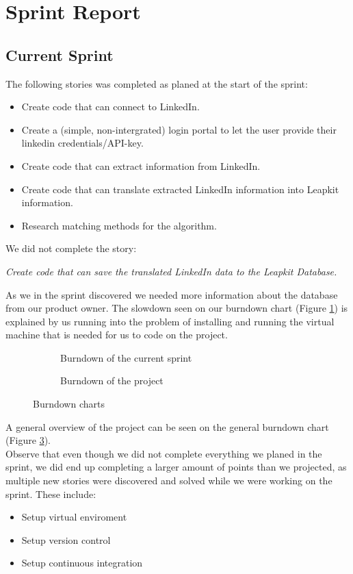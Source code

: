 \newpage
\section{Sprint Report}

\subsection{Current Sprint}

The following stories was completed as planed at the start of the sprint:
\begin{itemize}
    \item Create code that can connect to LinkedIn.
    \item Create a (simple, non-intergrated) login portal to let the user provide their linkedin credentials/API-key. 
    \item Create code that can extract information from LinkedIn.
    \item Create code that can translate extracted LinkedIn information into Leapkit information.
    \item Research matching methods for the algorithm.
\end{itemize}
We did not complete the story:
\begin{center}
    \emph{Create code that can save the translated LinkedIn data to the Leapkit Database.}
\end{center}
As we in the sprint discovered we needed more information about the database from our product owner. The slowdown seen on our burndown chart (Figure \ref{fig:burndownSprint}) is explained by us running into the problem of installing and running the virtual machine that is needed for us to code on the project.\\
\begin{figure}[!ht]
    \centering
    \begin{subfigure}[b]{0.5\textwidth}
        \scalebox{.6}{}
        \caption{Burndown of the current sprint}
        \label{fig:burndownSprint}
    \end{subfigure}%
    \begin{subfigure}[b]{0.5\textwidth}
        \scalebox{.7}{}
        \caption{Burndown of the project}
        \label{fig:burndownProject}
    \end{subfigure}
    \caption{Burndown charts}
\end{figure}
A general overview of the project can be seen on the general burndown chart (Figure \ref{fig:burndownProject}).\\
Observe that even though we did not complete everything we planed in the sprint, we did end up completing a larger amount of points than we projected, as multiple new stories were discovered and solved while we were working on the sprint. These include:
\begin{itemize}
    \item Setup virtual enviroment 
    \item Setup version control
    \item Setup continuous integration
\end{itemize}

